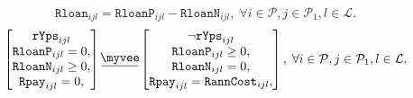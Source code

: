 \documentclass{amsbook}
\newcommand{\myveebar}{\mathbin{\vcenter{\hbox{$ \underline{\mkern-2.4mu{\myvee}\mkern-2.4mu} $}}}}
\begin{document}
%
\begin{equation}
    \mathtt{Rloan}_{ijl} = \mathtt{RloanP}_{ijl} - \mathtt{RloanN}_{ijl}
    , \; \forall i\in \mathcal{P}, j\in \mathcal{P}_1, l\in \mathcal{L}.
\end{equation}
%
\begin{equation}
    \begin{bmatrix}
        \mathtt{rYps}_{ijl} \\
        \mathtt{RloanP}_{ijl} = 0, \\
        \mathtt{RloanN}_{ijl} \geq 0,\\
        \mathtt{Rpay}_{ijl} = 0, \\
    \end{bmatrix}
    \myveebar
    \begin{bmatrix}
        \neg \mathtt{rYps}_{ijl} \\
        \mathtt{RloanP}_{ijl} \geq 0, \\
        \mathtt{RloanN}_{ijl} = 0, \\
        \mathtt{Rpay}_{ijl} = \mathtt{RannCost}_{ijl}, \\
    \end{bmatrix}
    , \; \forall i\in \mathcal{P}, j\in \mathcal{P}_1, l\in \mathcal{L}.
\end{equation}
\end{document}

